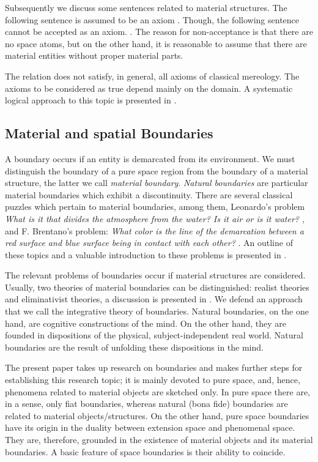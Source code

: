 \documentclass{ao2e}
\begin{document}
{Subsequently we discuss some sentences related to material structures. The following sentence is assumed to be
an axiom .
Though, the following sentence cannot be accepted as an axiom. . The reason for non-acceptance is that there are no space atoms, but on the other hand, it is reasonable to assume
that there are material entities without proper material parts.

The relation  does not satisfy, in general, all axioms of classical mereology. The axioms to be considered as true depend mainly on the domain. A systematic logical approach to this topic is
presented in \cite{herre-h-2010-b}.


 
\subsection{Material and spatial Boundaries}
A boundary occurs if an entity is demarcated from its environment. We must distinguish the boundary of a pure space region from the boundary of a material structure, the latter we call {\it material boundary}. 
{\it Natural boundaries} are particular material boundaries which exhibit a discontinuity. There are several classical puzzles which pertain to material boundaries, among them, Leonardo's problem {\it What is it that divides the atmosphere from the water? Is it air or is it water?} \cite{leonardo-v-1938-a}, and F. Brentano's problem: {\it What color is the line of the demarcation between a red surface and blue surface being in contact with each other?} \cite{brentano-f-1976-a}. An outline of these topics and a valuable introduction to these problems is presented in \cite{varzi-ac-2008-a}.

The relevant problems of boundaries occur if
material structures are considered. Usually, two theories of material boundaries can be distinguished: realist theories and eliminativist theories, a discussion is presented in \cite{varzi-ac-1997-a}. We defend an approach that we call the integrative theory of boundaries. 
Natural boundaries, on the one hand, are cognitive constructions of the mind. On the other hand, they are
founded in dispositions of the physical, subject-independent real world. Natural boundaries are the result of unfolding these dispositions in the mind.

The present paper takes up research on boundaries and makes further steps for establishing this research topic; it is mainly devoted to pure space, and, hence, phenomena related to material objects are sketched only. In pure space there are, in a sense, only fiat boundaries, whereas natural (bona fide) boundaries are related to material objects/structures.
On the other hand, pure space boundaries have its origin in the duality between extension space and phenomenal space. They are, therefore, grounded in the existence of material objects and its material boundaries.
A basic feature of space boundaries is their ability to coincide.

}
\end{document}
